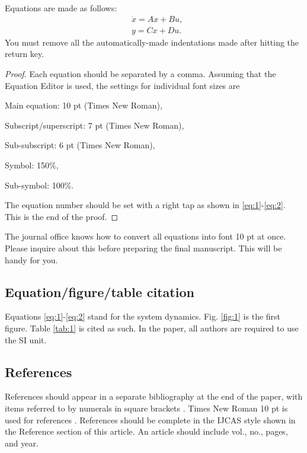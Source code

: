 \documentclass{IJCAS}
\begin{document}
\begin{theorem}
Equations are made as follows:
\begin{align} 
&\label{eq:1} 
\dot{x}=Ax+Bu, \\
&\label{eq:2} 
y=Cx+Du. 
\end{align} 
You must remove all the automatically-made indentations made after hitting the return key. 
\end{theorem}
\begin{proof}
Each equation should be separated by a comma. Assuming that the Equation Editor is used, the settings for individual font sizes are

Main equation: 10 pt (Times New Roman),

Subscript/superscript: 7 pt (Times New Roman),

Sub-subscript: 6 pt (Times New Roman),

Symbol: 150\%,

Sub-symbol: 100\%. 

The equation number should be set with a right tap as shown in \eqref{eq:1}-\eqref{eq:2}. This is the end of the proof.
\end{proof}



\begin{remark}
The journal office knows how to convert all equations into font 10 pt at once. Please inquire about this before preparing the final manuscript. This will be handy for you.
\end{remark}



\subsection{Equation/figure/table citation}

Equations \eqref{eq:1}-\eqref{eq:2} stand for the system dynamics. Fig. \ref{fig:1} is the first figure. Table \ref{tab:1} is cited as such. In the paper, all authors are required to use the SI unit.


\subsection{References}

References should appear in a separate bibliography at the end of the paper, with items referred to by numerals in square brackets \cite{1,3,4,5}. Times New Roman 10 pt is used for references \cite{2}. References should be complete in the IJCAS style shown in the Reference section of this article. An article should include vol., no., pages, and year.
\end{document}
